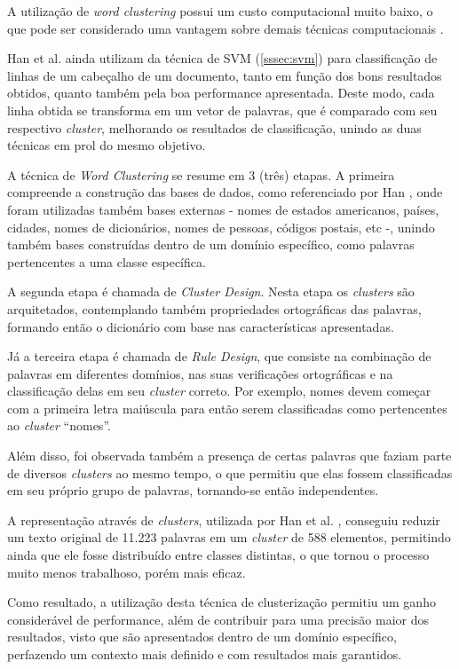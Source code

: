A utilização de \textit{word clustering} possui um custo computacional muito baixo, o que pode ser considerado uma vantagem sobre demais técnicas computacionais \cite{Han-Giles-WC}.

Han et al. ainda utilizam da técnica de SVM (\autoref{sssec:svm}) para classificação de linhas de um cabeçalho de um documento, tanto em função dos bons resultados obtidos, quanto também pela boa performance apresentada. Deste modo, cada linha obtida se transforma em um vetor de palavras, que é comparado com seu respectivo \textit{cluster}, melhorando os resultados de classificação, unindo as duas técnicas em prol do mesmo objetivo.

A técnica de \textit{Word Clustering} se resume em 3 (três) etapas. A primeira compreende a construção das bases de dados, como referenciado por Han \cite{Han-SVM}, onde foram utilizadas também bases externas - nomes de estados americanos, países, cidades, nomes de dicionários, nomes de pessoas, códigos postais, etc -, unindo também bases construídas dentro de um domínio específico, como palavras pertencentes a uma classe específica.

A segunda etapa é chamada de \textit{Cluster Design}. Nesta etapa os \textit{clusters} são arquitetados, contemplando também propriedades ortográficas das palavras, formando então o dicionário com base nas características apresentadas.

Já a terceira etapa é chamada de \textit{Rule Design}, que consiste na combinação de palavras em diferentes domínios, nas suas verificações ortográficas e na classificação delas em seu \textit{cluster} correto. Por exemplo, nomes devem começar com a primeira letra maiúscula para então serem classificadas como pertencentes ao \textit{cluster} ``nomes''.

Além disso, foi observada também a presença de certas palavras que faziam parte de diversos \textit{clusters} ao mesmo tempo, o que permitiu que elas fossem classificadas em seu próprio grupo de palavras, tornando-se então independentes.

A representação através de \textit{clusters}, utilizada por Han et al. \cite{Han-Giles-WC}, conseguiu reduzir um texto original de 11.223 palavras em um \textit{cluster} de 588 elementos, permitindo ainda que ele fosse distribuído entre classes distintas, o que tornou o processo muito menos trabalhoso, porém mais eficaz.

Como resultado, a utilização desta técnica de clusterização permitiu um ganho considerável de performance, além de contribuir para uma precisão maior dos resultados, visto que são apresentados dentro de um domínio específico, perfazendo um contexto mais definido e com resultados mais garantidos.


